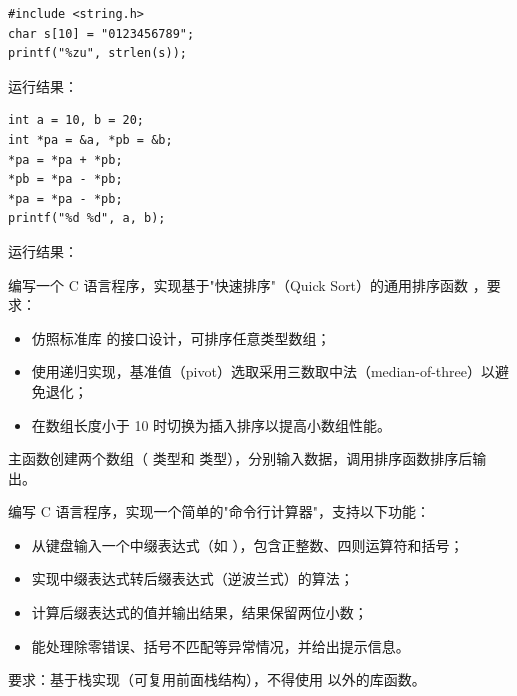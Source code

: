 \documentclass[a4paper,11pt]{article}
\begin{document}
\q
\begin{lstlisting}[language={[custom]C}]
#include <string.h>
char s[10] = "0123456789";
printf("%zu", strlen(s));
\end{lstlisting}
运行结果：\underline{\hspace{3cm}}


\q
\begin{lstlisting}[language={[custom]C}]
int a = 10, b = 20;
int *pa = &a, *pb = &b;
*pa = *pa + *pb;
*pb = *pa - *pb;
*pa = *pa - *pb;
printf("%d %d", a, b);
\end{lstlisting}
运行结果：\underline{\hspace{3cm}}


\pq 编写一个 C 语言程序，实现基于"快速排序"（Quick Sort）的通用排序函数 ，要求：
\begin{itemize}
  \item 仿照标准库  的接口设计，可排序任意类型数组；
  \item 使用递归实现，基准值（pivot）选取采用三数取中法（median-of-three）以避免退化；
  \item 在数组长度小于 10 时切换为插入排序以提高小数组性能。
\end{itemize}
主函数创建两个数组（ 类型和  类型），分别输入数据，调用排序函数排序后输出。

\anslines{5.5cm}

\pq 编写 C 语言程序，实现一个简单的"命令行计算器"，支持以下功能：
\begin{itemize}
  \item 从键盘输入一个中缀表达式（如 ），包含正整数、四则运算符和括号；
  \item 实现中缀表达式转后缀表达式（逆波兰式）的算法；
  \item 计算后缀表达式的值并输出结果，结果保留两位小数；
  \item 能处理除零错误、括号不匹配等异常情况，并给出提示信息。
\end{itemize}
要求：基于栈实现（可复用前面栈结构），不得使用  以外的库函数。

\anslines{6cm}

\end{document}
